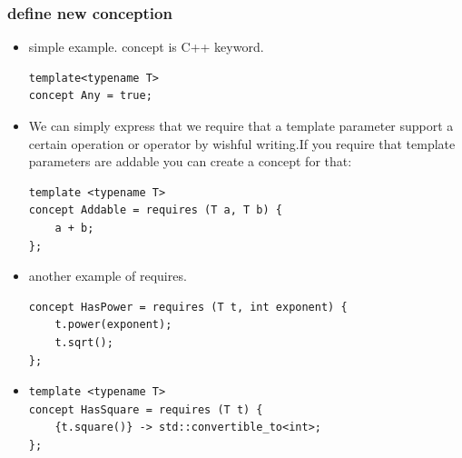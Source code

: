 \documentclass[a4paper,11pt,twoside]{book}
\begin{document}
\subsubsection{define new conception}
\begin{itemize}
	\item simple example. concept is C++ keyword.
\begin{lstlisting}
template<typename T> 
concept Any = true;
\end{lstlisting}

\item We can simply express that we require that a template parameter support a certain operation or operator by wishful writing.If you require that template parameters are addable you can create a concept for that:

\begin{lstlisting}
template <typename T>
concept Addable = requires (T a, T b) {
	a + b; 
};
\end{lstlisting}

\item another example of requires.

\begin{lstlisting}
concept HasPower = requires (T t, int exponent) {
	t.power(exponent);
	t.sqrt();
};
\end{lstlisting}

\item 

\begin{lstlisting}
template <typename T>
concept HasSquare = requires (T t) {
	{t.square()} -> std::convertible_to<int>;
}; 
\end{lstlisting}

\end{itemize}
\end{document}
